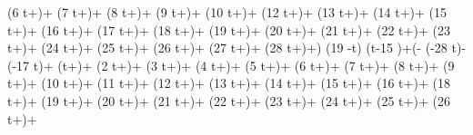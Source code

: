    \left(6 t+\right)+ \sin \left(7 t+\right)+
   \sin \left(8 t+\right)+ \sin \left(9
   t+\right)+ \sin \left(10 t+\right)+ \sin
   \left(12 t+\right)+ \sin \left(13 t+\right)+
   \sin \left(14 t+\right)+ \sin \left(15
   t+\right)+ \sin \left(16 t+\right)+ \sin
   \left(17 t+\right)+ \sin \left(18 t+\right)+
   \sin \left(19 t+\right)+ \sin \left(20
   t+\right)+ \sin \left(21 t+\right)+ \sin
   \left(22 t+\right)+ \sin \left(23 t+\right)+
   \sin \left(24 t+\right)+ \sin \left(25
   t+\right)+ \sin \left(26 t+\right)+ \sin
   \left(27 t+\right)+ \sin \left(28
   t+\right)+\right) \theta (19 \pi -t) \theta (t-15 \pi
   )+\left(- \sin \left(-28 t\right)- \sin
   \left(-17 t\right)+ \sin \left(t+\right)+
   \sin \left(2 t+\right)+ \sin \left(3
   t+\right)+ \sin \left(4 t+\right)+ \sin
   \left(5 t+\right)+ \sin \left(6 t+\right)+ \sin
   \left(7 t+\right)+ \sin \left(8 t+\right)+ \sin
   \left(9 t+\right)+ \sin \left(10 t+\right)+
   \sin \left(11 t+\right)+ \sin \left(12
   t+\right)+ \sin \left(13 t+\right)+ \sin
   \left(14 t+\right)+ \sin \left(15 t+\right)+
   \sin \left(16 t+\right)+ \sin \left(18
   t+\right)+ \sin \left(19 t+\right)+ \sin
   \left(20 t+\right)+ \sin \left(21 t+\right)+
   \sin \left(22 t+\right)+ \sin \left(23
   t+\right)+ \sin \left(24 t+\right)+ \sin
   \left(25 t+\right)+ \sin \left(26 t+\right)+
